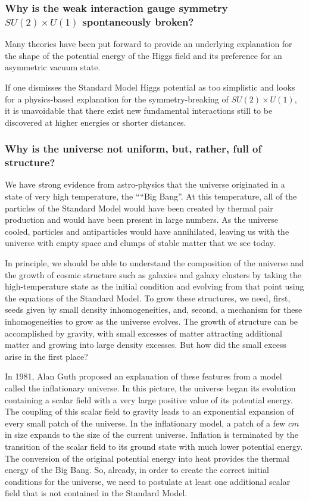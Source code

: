 \documentclass[../../main/main.tex]{subfiles}
\begin{document}
\subsubsection{Why is the weak interaction gauge symmetry \( SU(2) \times U(1) \) spontaneously broken?}
Many theories have been put forward to provide an underlying explanation for the shape of the potential energy of the Higgs field and its preference for an asymmetric vacuum state.

If one dismisses the Standard Model Higgs potential as too simplistic and looks for a physics-based explanation for the symmetry-breaking of \( SU(2) \times U(1) \), it is unavoidable that there exist new fundamental interactions still to be discovered at higher energies or shorter distances.


\subsubsection{Why is the universe not uniform, but, rather, full of structure?}
We have strong evidence from astro-physics that the universe originated in a state of very high temperature, the ````Big Bang''. At this temperature, all of the particles of the Standard Model would have been created by thermal pair production and would have been present in large numbers. As the universe cooled, particles and antiparticles would have annihilated, leaving us with the universe with empty space and clumps of stable matter that we see today.

In principle, we should be able to understand the composition of the universe and the growth of cosmic structure such as galaxies and galaxy clusters by taking the high-temperature state as the initial condition and evolving from that point using the equations of the Standard Model. To grow these structures, we need, first, seeds given by small density inhomogeneities, and, second, a mechanism for these inhomogeneities to grow as the universe evolves. The growth of structure can be accomplished by gravity, with small excesses of matter attracting additional matter and growing into large density excesses. But how did the small excess arise in the first place?

In 1981, Alan Guth proposed an explanation of these features from a model called the inflationary universe. In this picture, the universe began its evolution containing a scalar field with a very large positive value of its potential energy. The coupling of this scalar field to gravity leads to an exponential expansion of every small patch of the universe. In the inflationary model, a patch of a few \( \si{cm} \) in size expands to the size of the current universe. Inflation is terminated by the transition of the scalar field to its ground state with much lower potential energy. The conversion of the original potential energy into heat provides the thermal energy of the Big Bang. So, already, in order to create the correct initial conditions for the universe, we need to postulate at least one additional scalar field that is not contained in the Standard Model.
\end{document}
